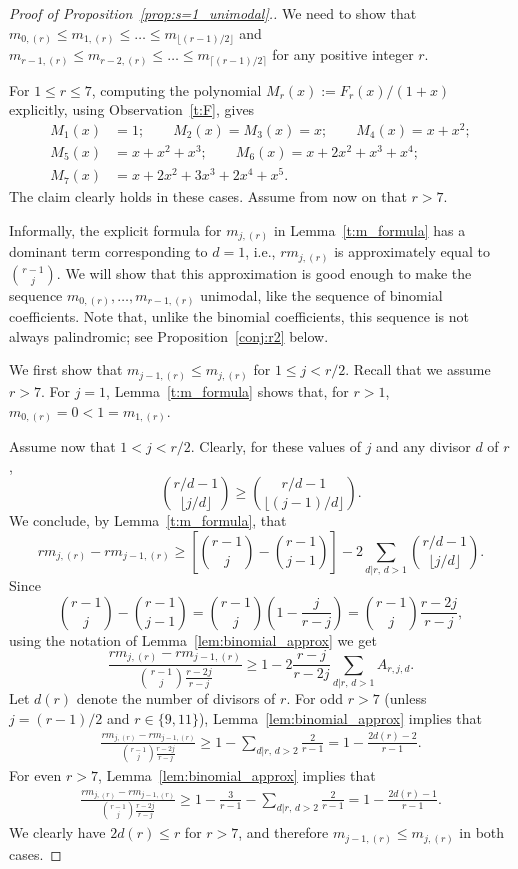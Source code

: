 \documentclass[ALCO,published]{cedram}
\begin{document}
\begin{proof}[Proof of Proposition~\ref{prop:s=1_unimodal}.]
    We need to show that $m_{0,(r)} \le m_{1,(r)} \le \ldots \le m_{\lfloor (r-1)/2 \rfloor}$ and     $m_{r-1,(r)} \le m_{r-2,(r)} \le \ldots \le m_{\lceil (r-1)/2 \rceil}$ for any positive integer $r$.
    
	For $1 \le r \le 7$, computing the polynomial $M_r(x) := F_r(x)/(1+x)$ explicitly, using Observation~\ref{t:F}, gives
	\begin{align*}
		M_1(x) &= 1; \qquad 
		M_2(x) = M_3(x) = x; \qquad
		M_4(x) = x+x^2; \\
		M_5(x) &= x+x^2+x^3; \qquad
		M_6(x) = x+2x^2+x^3+x^4; \\
		M_7(x) &= x+2x^2+3x^3+2x^4+x^5.
	\end{align*}
	The claim clearly holds in these cases.
	Assume from now on that $r > 7$.
	
    Informally, the explicit formula for $m_{j,(r)}$ in Lemma~\ref{t:m_formula} has a dominant term corresponding to $d=1$, i.e.,
    $rm_{j,(r)}$ is approximately equal to $\binom{r - 1}{j}$. 
    We will show that this approximation is good enough to make the sequence $m_{0,(r)}, \ldots, m_{r-1,(r)}$ unimodal, like the sequence of binomial coefficients.
    Note that, unlike the binomial coefficients, this sequence is not always palindromic; see Proposition~\ref{conj:r2} below.
    
	We first show that $m_{j-1,(r)} \le m_{j,(r)}$ for $1 \le j < r/2$. Recall that we assume $r > 7$.
	For $j=1$, Lemma~\ref{t:m_formula} shows that, 
	for $r > 1$, $m_{0,(r)} = 0 < 1 = m_{1,(r)}$. 
	
    Assume now that  $1 < j < r/2$.	
    Clearly, for these values of $j$ and any divisor $d$ of $r$,
	\[
	   \binom{r/d - 1}{\lfloor j/d \rfloor} 
	   \ge \binom{r/d - 1}{\lfloor (j-1)/d \rfloor}.
	\]
	We conclude, by Lemma~\ref{t:m_formula}, that
	\[
	    rm_{j,(r)} - rm_{j-1,(r)} 
	    \ge \left[ \binom{r-1}{j} - \binom{r-1}{j-1} \right] - 2\sum_{d|r,\,d>1} \binom{r/d - 1}{\lfloor j/d \rfloor}. 
    \]
	Since
	\[
	    \binom{r-1}{j} - \binom{r-1}{j-1}
	    = \binom{r-1}{j} \left(1 - \frac{j}{r-j}\right)
	    = \binom{r-1}{j} \frac{r-2j}{r-j},
	\]
    using the notation of Lemma~\ref{lem:binomial_approx} we get
	\[
	   \frac{rm_{j,(r)} - rm_{j-1,(r)}} {\binom{r-1}{j}\frac{r-2j}{r-j}}
	   \ge 1 - 2\frac{r-j}{r-2j} \sum_{d|r,\,d>1} A_{r,j,d}.
	\]
	Let $d(r)$ denote the number of divisors of $r$. 
	For odd $r>7$ (unless $j = (r-1)/2$ and $r \in \{9,11\}$), Lemma~\ref{lem:binomial_approx} implies that
	\begin{align*}
		\frac{rm_{j,(r)} - rm_{j-1,(r)}} {\binom{r-1}{j}\frac{r-2j}{r-j}} 
		\ge 1 - \sum_{d|r,\,d>2} \frac{2}{r-1} 
		= 1 - \frac{2d(r)-2}{r-1}.
	\end{align*}
	For even $r>7$, Lemma~\ref{lem:binomial_approx} implies that
	\begin{align*}
		\frac{rm_{j,(r)} - rm_{j-1,(r)}} {\binom{r-1}{j}\frac{r-2j}{r-j}} 
		\ge 1 - \frac{3}{r-1} - \sum_{d|r,\,d>2} \frac{2}{r-1}
		= 1 - \frac{2d(r)-1}{r-1}.
	\end{align*}
    We clearly have $2d(r) \le r$ for $r>7$, and therefore $m_{j-1,(r)} \le m_{j,(r)}$ in both cases.
	

\end{proof}
\end{document}
